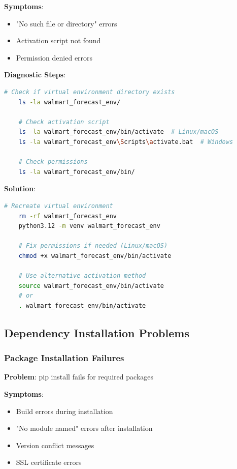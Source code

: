 \textbf{Symptoms}:
\begin{itemize}
	\item "No such file or directory" errors
	\item Activation script not found
	\item Permission denied errors
\end{itemize}

\textbf{Diagnostic Steps}:
\begin{lstlisting}[language=bash,basicstyle=\color{blue}]
	# Check if virtual environment directory exists
	ls -la walmart_forecast_env/
	
	# Check activation script
	ls -la walmart_forecast_env/bin/activate  # Linux/macOS
	ls -la walmart_forecast_env\Scripts\activate.bat  # Windows
	
	# Check permissions
	ls -la walmart_forecast_env/bin/
\end{lstlisting}

\textbf{Solution}:
\begin{lstlisting}[language=bash,basicstyle=\color{blue}]
	# Recreate virtual environment
	rm -rf walmart_forecast_env
	python3.12 -m venv walmart_forecast_env
	
	# Fix permissions if needed (Linux/macOS)
	chmod +x walmart_forecast_env/bin/activate
	
	# Use alternative activation method
	source walmart_forecast_env/bin/activate
	# or
	. walmart_forecast_env/bin/activate
\end{lstlisting}

\subsection{Dependency Installation Problems}

\subsubsection{Package Installation Failures}

\textbf{Problem}: pip install fails for required packages

\textbf{Symptoms}:
\begin{itemize}
	\item Build errors during installation
	\item "No module named" errors after installation
	\item Version conflict messages
	\item SSL certificate errors
\end{itemize}

